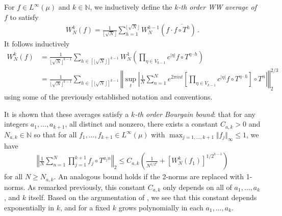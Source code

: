 \documentclass[11pt, oneside]{amsart}   	%
\newcommand{\1}{\mathbbm{1}}
\newcommand{\floor}[1]{\lfloor#1\rfloor}
\theoremstyle{definition}
\begin{document}
For $f\in L^\infty(\mu)$ and $k\in \mathbb{N}$, we inductively define the \textit{$k$-th order WW average of $f$} to satisfy
\begin{align}\label{F:inductive construction of WW averages}
W^{k}_N(f) = \frac{1}{\floor{\sqrt{N}}}\sum_{h=1}^{\floor{\sqrt{N}}} W^{k-1}_N \left( f \cdot \overline{f \circ T^h} \right) \, .
\end{align}
It follows inductively 
\begin{align*}
W^{k}_N(f) &= \frac{1}{\floor{\sqrt{N}}^{k-1}}\sum_{h\in [\floor{\sqrt{N}}]^{k-1}} W^{1}_N \left( \prod_{\eta\in V_{k-1}} c^{|\eta|} f\circ T^{\eta \cdot h} \right) \\
&=\frac{1}{\floor{\sqrt{N}}^{k-1}}\sum_{h\in [\floor{\sqrt{N}}]^{k-1}}  \left\Vert \sup_t \left| \frac{1}{N} \sum_{n=1}^N e^{2\pi i n t}\left[\prod_{\eta\in V_{k-1}} c^{|\eta|} f\circ T^{\eta \cdot h} \right]\circ T^n\right| \right\Vert_2^{2/3}
\end{align*}
using some of the previously established notation and conventions.

It is shown that these averages satisfy a \textit{$k$-th order Bourgain bound}: that for any integers $a_1, \dots, a_{k+1}$, all distinct and nonzero, there exists a constant $C_{a, k}>0$ and $N_{a, k}\in \mathbb{N}$ so that for all 
$f_1, \dots, f_{k+1} \in L^\infty(\mu)$ with  $\max_{j=1, \dots, k+1} \Vert f_j \Vert_{\infty} \leq 1$, we have
\begin{align}\label{L:BB}
\left\Vert \frac{1}{N}\sum_{n=1}^N \prod_{j=1}^{k+1} f_j \circ T^{a_j n} \right \Vert_2 \leq C_{a, k} \left( \frac{1}{N^{1/2^k}} + \left[W_N^k (f_1)\right]^{1/2^{k-1}} \right)
\end{align}
for all $N \geq N_{a, k}$. An analogous bound holds if the 2-norms are replaced with 1-norms. As remarked previously, this constant $C_{a, k}$ only depends on all of $a_1, \dots, a_k$, and $k$ itself. Based on the argumentation of \cite{assani2024higherorderwienerwintnersystems}, we see that this constant depends exponentially in $k$, and for a fixed $k$ grows polynomially in each $a_1, \dots, a_k$.
\end{document}

